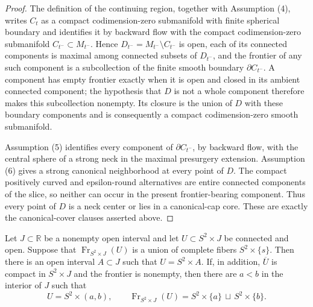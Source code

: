 \begin{proof}
The definition of the continuing region, together with Assumption (4),
writes $C_t$ as a compact codimension-zero submanifold with finite spherical
boundary and identifies it by backward flow with the compact
codimension-zero submanifold $C_{t^-}\subset M_{t^-}$.  Hence
$D_{t^-}=M_{t^-}\setminus C_{t^-}$ is open, each of its connected components
is maximal among connected subsets of $D_{t^-}$, and the frontier of any such
component is a subcollection of the finite smooth boundary
$\partial C_{t^-}$.  A component has empty frontier exactly when it is open
and closed in its ambient connected component; the hypothesis that $D$ is not
a whole component therefore makes this subcollection nonempty.  Its closure
is the union of $D$ with these boundary components and is consequently a
compact codimension-zero smooth submanifold.

Assumption (5) identifies every component of $\partial C_{t^-}$, by backward
flow, with the central sphere of a strong neck in the maximal presurgery
extension.  Assumption (6) gives a strong canonical neighborhood at every
point of $D$.  The compact positively curved and epsilon-round alternatives
are entire connected components of the slice, so neither can occur in the
present frontier-bearing component.  Thus every point of $D$ is a neck center
or lies in a canonical-cap core.  These are exactly the canonical-cover
clauses asserted above.
\end{proof}

\begin{lemma}
\label{lem:fiber-saturation-from-spherical-frontier}
\notready
Let $J\subset\mathbb R$ be a nonempty open interval and let
$U\subset S^2\times J$ be connected and open.  Suppose that
$\operatorname{Fr}_{S^2\times J}(U)$ is a union of complete fibers
$S^2\times\{s\}$.  Then there is an open interval $A\subset J$ such that
$U=S^2\times A$.  If, in addition, $\overline U$ is compact in
$S^2\times J$ and the frontier is nonempty, then there are $a<b$ in the
interior of $J$ such that
\[
 U=S^2\times(a,b),\qquad
 \operatorname{Fr}_{S^2\times J}(U)
 =S^2\times\{a\}\,\sqcup\,S^2\times\{b\}.
\]
\end{lemma}

